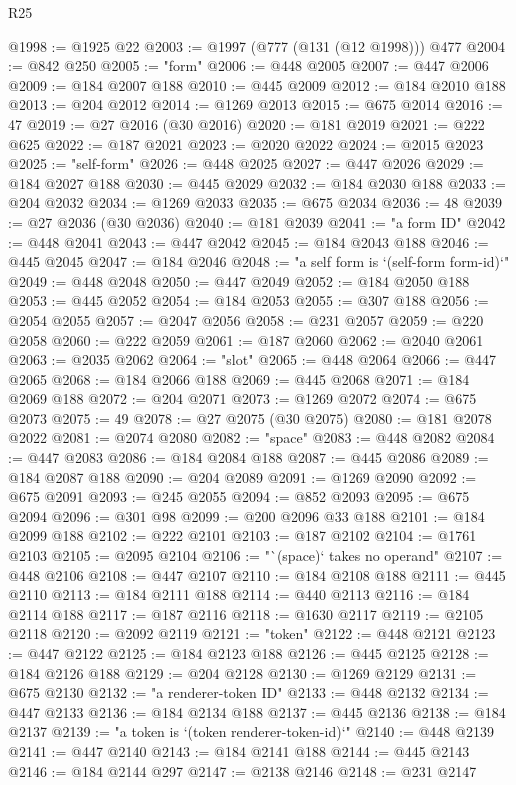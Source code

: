 \begin{lexlean}{R25}
\begin{coremodule}
@1998 := @1925 @22
@2003 := @1997 (@777 (@131 (@12 @1998))) @477
@2004 := @842 @250
@2005 := "form"
@2006 := @448 @2005
@2007 := @447 @2006
@2009 := @184 @2007 @188
@2010 := @445 @2009
@2012 := @184 @2010 @188
@2013 := @204 @2012
@2014 := @1269 @2013
@2015 := @675 @2014
@2016 := 47
@2019 := @27 @2016 (@30 @2016)
@2020 := @181 @2019
@2021 := @222 @625
@2022 := @187 @2021
@2023 := @2020 @2022
@2024 := @2015 @2023
@2025 := "self-form"
@2026 := @448 @2025
@2027 := @447 @2026
@2029 := @184 @2027 @188
@2030 := @445 @2029
@2032 := @184 @2030 @188
@2033 := @204 @2032
@2034 := @1269 @2033
@2035 := @675 @2034
@2036 := 48
@2039 := @27 @2036 (@30 @2036)
@2040 := @181 @2039
@2041 := "a form ID"
@2042 := @448 @2041
@2043 := @447 @2042
@2045 := @184 @2043 @188
@2046 := @445 @2045
@2047 := @184 @2046
@2048 := "a self form is `(self-form form-id)`"
@2049 := @448 @2048
@2050 := @447 @2049
@2052 := @184 @2050 @188
@2053 := @445 @2052
@2054 := @184 @2053
@2055 := @307 @188
@2056 := @2054 @2055
@2057 := @2047 @2056
@2058 := @231 @2057
@2059 := @220 @2058
@2060 := @222 @2059
@2061 := @187 @2060
@2062 := @2040 @2061
@2063 := @2035 @2062
@2064 := "slot"
@2065 := @448 @2064
@2066 := @447 @2065
@2068 := @184 @2066 @188
@2069 := @445 @2068
@2071 := @184 @2069 @188
@2072 := @204 @2071
@2073 := @1269 @2072
@2074 := @675 @2073
@2075 := 49
@2078 := @27 @2075 (@30 @2075)
@2080 := @181 @2078 @2022
@2081 := @2074 @2080
@2082 := "space"
@2083 := @448 @2082
@2084 := @447 @2083
@2086 := @184 @2084 @188
@2087 := @445 @2086
@2089 := @184 @2087 @188
@2090 := @204 @2089
@2091 := @1269 @2090
@2092 := @675 @2091
@2093 := @245 @2055
@2094 := @852 @2093
@2095 := @675 @2094
@2096 := @301 @98
@2099 := @200 @2096 @33 @188
@2101 := @184 @2099 @188
@2102 := @222 @2101
@2103 := @187 @2102
@2104 := @1761 @2103
@2105 := @2095 @2104
@2106 := "`(space)` takes no operand"
@2107 := @448 @2106
@2108 := @447 @2107
@2110 := @184 @2108 @188
@2111 := @445 @2110
@2113 := @184 @2111 @188
@2114 := @440 @2113
@2116 := @184 @2114 @188
@2117 := @187 @2116
@2118 := @1630 @2117
@2119 := @2105 @2118
@2120 := @2092 @2119
@2121 := "token"
@2122 := @448 @2121
@2123 := @447 @2122
@2125 := @184 @2123 @188
@2126 := @445 @2125
@2128 := @184 @2126 @188
@2129 := @204 @2128
@2130 := @1269 @2129
@2131 := @675 @2130
@2132 := "a renderer-token ID"
@2133 := @448 @2132
@2134 := @447 @2133
@2136 := @184 @2134 @188
@2137 := @445 @2136
@2138 := @184 @2137
@2139 := "a token is `(token renderer-token-id)`"
@2140 := @448 @2139
@2141 := @447 @2140
@2143 := @184 @2141 @188
@2144 := @445 @2143
@2146 := @184 @2144 @297
@2147 := @2138 @2146
@2148 := @231 @2147

\end{coremodule}
\end{lexlean}
